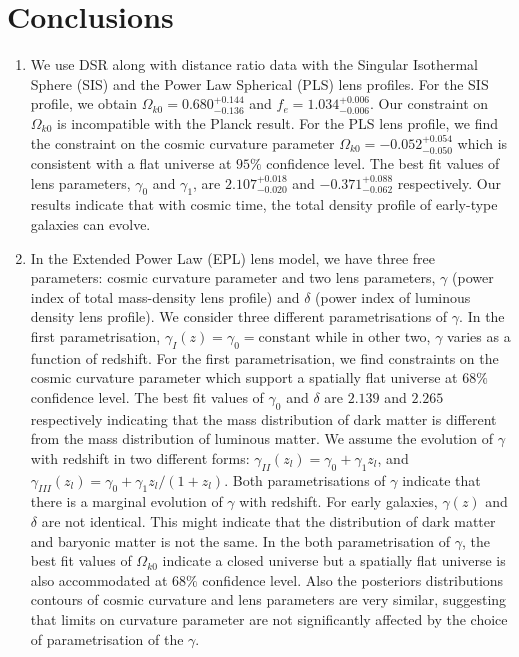 \documentclass[12pt]{report}
\begin{document}
\section{Conclusions}
\begin{enumerate}
\item
We use DSR along with distance ratio data with the Singular Isothermal Sphere (SIS) and the  Power Law Spherical (PLS) lens profiles. For  the SIS profile, we obtain $\Omega_{k 0}=0.680_{-0.136}^{+0.144}$ and $f_e=1.034_{-0.006}^{+0.006}$. Our constraint on $\Omega_{k0}$ is incompatible with the Planck result. For the PLS lens profile, we find the constraint on the cosmic curvature parameter $\Omega_{k0}=-0.052^{+0.054}_{-0.050}$ which is consistent with a flat universe at $95\%$ confidence level. The best fit values of lens parameters, $\gamma_{0}$ and $\gamma_{1}$, are $2.107_{-0.020}^{+0.018}$ and $-0.371_{-0.062}^{+0.088}$ respectively. Our results indicate that with cosmic time, the total density profile of early-type galaxies can evolve.
\item
In the Extended Power Law (EPL) lens model, we have three free parameters: cosmic curvature parameter and two lens parameters, $\gamma$ (power index of total mass-density lens profile) and $\delta$ (power index of luminous density lens profile). We consider three different parametrisations of $\gamma$. In the first parametrisation, $\gamma_I(z)=\gamma_0=\text{constant}$ while in other two, $\gamma$  varies as a function of redshift. For the first parametrisation, we find constraints on the cosmic curvature parameter which support a spatially flat universe at $68\%$ confidence level. The best fit values of $\gamma_0$ and $\delta$ are $2.139$ and $2.265$ respectively indicating that the mass distribution of dark matter is different from the mass distribution of luminous matter. We assume the evolution of $\gamma$ with redshift in two different forms: $\gamma_{II}(z_l)=\gamma_0+\gamma_1z_l$, and $\gamma_{III}(z_l)=\gamma_0+\gamma_1z_l/(1+z_l)$. Both parametrisations of $\gamma$ indicate that there is a marginal evolution of $\gamma$ with redshift. For early galaxies, $\gamma(z)$ and $\delta$ are not identical. This might indicate that the distribution of dark matter and baryonic matter is not the same. In the both parametrisation of $\gamma$, the best fit values of $\Omega_{k0}$ indicate a closed universe but a spatially flat universe is also accommodated at $68\%$ confidence level. Also the posteriors distributions contours of cosmic curvature and lens parameters are very similar, suggesting that limits on curvature parameter are not significantly affected by the choice of parametrisation of the $\gamma$.

\end{enumerate}
\end{document}
